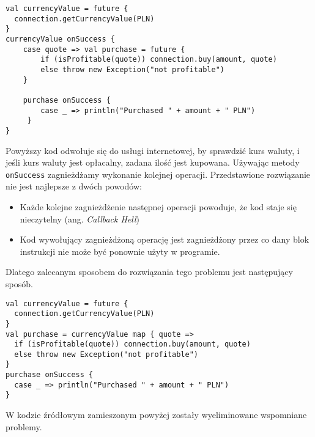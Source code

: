 \begin{lstlisting}
val currencyValue = future {
  connection.getCurrencyValue(PLN)
}
currencyValue onSuccess { 
	case quote => val purchase = future {
		if (isProfitable(quote)) connection.buy(amount, quote)
		else throw new Exception("not profitable")
	}
  
	purchase onSuccess {
		case _ => println("Purchased " + amount + " PLN")
	 }
}
\end{lstlisting}

Powyższy kod odwołuje się do usługi internetowej, by sprawdzić kurs waluty, i jeśli kurs waluty jest opłacalny, zadana ilość jest kupowana.
Używając metody \lstinline{onSuccess} zagnieżdżamy wykonanie kolejnej operacji. Przedstawione rozwiązanie nie jest najlepsze z dwóch powodów:
\begin{itemize}
	\item Każde kolejne zagnieżdżenie następnej operacji powoduje, że kod staje się nieczytelny (ang. \emph{Callback Hell})
	\item Kod wywołujący zagnieżdżoną operację jest zagnieżdżony przez co dany blok instrukcji nie może być ponownie użyty w programie.
\end{itemize}

Dlatego zalecanym sposobem do rozwiązania tego problemu jest następujący sposób.

\begin{lstlisting}
val currencyValue = future {
  connection.getCurrencyValue(PLN)
}
val purchase = currencyValue map { quote => 
  if (isProfitable(quote)) connection.buy(amount, quote)
  else throw new Exception("not profitable")
}
purchase onSuccess {
  case _ => println("Purchased " + amount + " PLN")
}
\end{lstlisting}

W kodzie źródłowym zamieszonym powyżej zostały wyeliminowane wspomniane problemy. 
